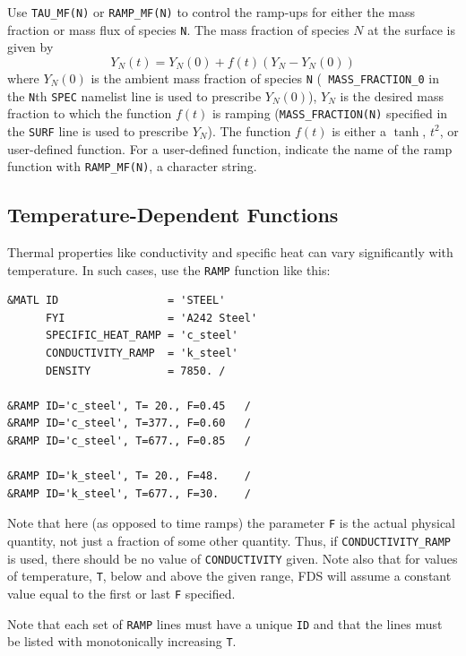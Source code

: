 \documentclass[11pt]{book}
\newcommand{\ct}{\tt\small}
\begin{document}
Use {\ct TAU\_MF(N)} or {\ct RAMP\_MF(N)}
to control the ramp-ups for either the mass
fraction or mass flux of species {\ct N}.
The mass fraction of species $N$ at the surface is given by
$$ Y_N(t) = Y_N(0) + f(t) \left( Y_N - Y_N(0) \right) $$ where
$Y_N(0)$ is the ambient mass fraction of species {\ct N} ({\ct
MASS\_FRACTION\_0} in the {\ct N}th {\ct SPEC} namelist line is used
to prescribe $Y_N(0)$), $Y_N$ is the desired mass fraction to which
the function $f(t)$ is ramping ({\ct MASS\_FRACTION(N)} specified in
the {\ct SURF} line is used to prescribe $Y_N$).  The function $f(t)$
is either a $\tanh$, $t^2$, or user-defined function. For a
user-defined function, indicate the name of the ramp function with
{\ct RAMP\_MF(N)}, a character string.

\subsection{Temperature-Dependent Functions}

Thermal properties like conductivity and specific heat can vary significantly with temperature. In such cases, use
the {\ct RAMP} function like this:

\footnotesize
\begin{verbatim}
&MATL ID                 = 'STEEL'
      FYI                = 'A242 Steel'
      SPECIFIC_HEAT_RAMP = 'c_steel'
      CONDUCTIVITY_RAMP  = 'k_steel'
      DENSITY            = 7850. /

&RAMP ID='c_steel', T= 20., F=0.45   /
&RAMP ID='c_steel', T=377., F=0.60   /
&RAMP ID='c_steel', T=677., F=0.85   /

&RAMP ID='k_steel', T= 20., F=48.    /
&RAMP ID='k_steel', T=677., F=30.    /
\end{verbatim}
\normalsize

\noindent
Note that here (as opposed to time ramps) the parameter {\ct F} is the actual physical quantity, not just
a fraction of some other quantity. Thus, if {\ct CONDUCTIVITY\_RAMP} is used, there should be no
value of {\ct CONDUCTIVITY} given. Note also that for values of temperature, {\ct T}, below and above the
given range, FDS will assume a constant value equal to the first or last {\ct F} specified.

\begin{warning}
\noindent
Note that each set of {\ct RAMP} lines must have a unique {\ct ID} and that the lines must
be listed with monotonically increasing {\ct T}.
\end{warning}
\end{document}
